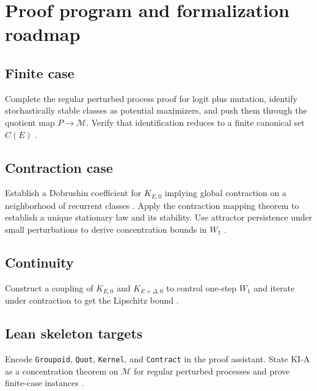 \documentclass[11pt]{article}
\newcommand{\1}{\mathbbm{1}}
\newcommand{\Wone}{W_1}
\begin{document}
\section{Proof program and formalization roadmap}
\subsection{Finite case}
Complete the regular perturbed process proof for logit plus mutation, identify stochastically stable classes as potential maximizers, and push them through the quotient map $P \to \mathcal{M}$. Verify that identification reduces to a finite canonical set $C(E)$ \parencite{Young1993,Kandori1993}. 

\subsection{Contraction case}
Establish a Dobrushin coefficient for $K_{E,0}$ implying global contraction on a neighborhood of recurrent classes \parencite{Dobrushin1956}. Apply the contraction mapping theorem to establish a unique stationary law and its stability. Use attractor persistence under small perturbations to derive concentration bounds in $\Wone$ \parencite{Villani2009}.

\subsection{Continuity}
Construct a coupling of $K_{E,0}$ and $K_{E+\Delta,0}$ to control one-step $\Wone$ and iterate under contraction to get the Lipschitz bound \parencite{Villani2009}.

\subsection{Lean skeleton targets}
Encode \texttt{Groupoid}, \texttt{Quot}, \texttt{Kernel}, and \texttt{Contract} in the proof assistant. State KI-A as a concentration theorem on $\mathcal{M}$ for regular perturbed processes and prove finite-case instances \parencite{Young1993,Kandori1993}.
\end{document}
